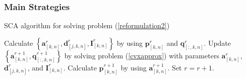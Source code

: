 \documentclass[handout,11.5pt]{beamer}
\begin{document}
\begin{frame}
\frametitle{Main Strategies}

\begin{algorithm}[H]
	\caption{SCA algorithm for solving problem (\ref{reformulation2})}
	\label{alg:1}
	\scriptsize
	\begin{algorithmic}[1]
		\Repeat 
		\State Calculate $\left\{\boldsymbol{a}^r_{[k,n]},\boldsymbol{d}^r_{[j,k,n]},\boldsymbol{I}^r_{[k,n]}\right\}$ by using $\boldsymbol{p}^r_{[k,n]}$ and $\boldsymbol{q}^r_{[:,k,n]}$.
		\State Update $\left\{\boldsymbol{a}^{r+1}_{[k,n]},\boldsymbol{q}^{r+1}_{[:,k,n]}\right\}$ by solving problem (\ref{cvxapprox}) with parameters $\boldsymbol{a}^r_{[k,n]}$, $\boldsymbol{d}^r_{[j,k,n]}$, and $\boldsymbol{I}^r_{[k,n]}$.
		\State Calculate $\boldsymbol{p}^{r+1}_{[k,n]}$ by using $\boldsymbol{a}^{r+1}_{[k,n]}$.
		\State Set $r=r+1$.
		 \\
	\end{algorithmic}
\end{algorithm}

\end{frame}
\end{document}
